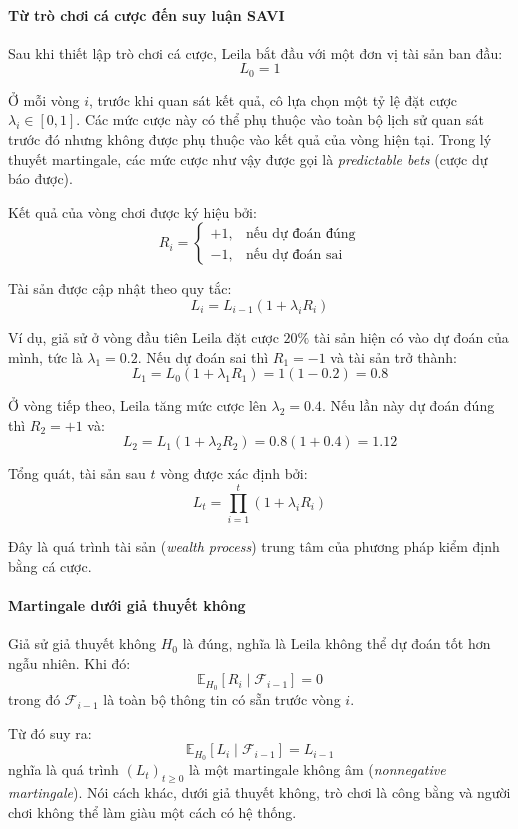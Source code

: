 \paragraph{Từ trò chơi cá cược đến suy luận SAVI}

Sau khi thiết lập trò chơi cá cược, Leila bắt đầu với một đơn vị tài sản ban đầu:
\[
    L_0 = 1
\]

Ở mỗi vòng $i$, trước khi quan sát kết quả, cô lựa chọn một tỷ lệ đặt cược $\lambda_i \in [0,1]$. Các mức cược này có thể phụ thuộc vào toàn bộ lịch sử quan sát trước đó nhưng không được phụ thuộc vào kết quả của vòng hiện tại. Trong lý thuyết martingale, các mức cược như vậy được gọi là \textit{predictable bets} (cược dự báo được).

Kết quả của vòng chơi được ký hiệu bởi:
\[
    R_i = 
    \begin{cases}
        +1, & \text{nếu dự đoán đúng} \\
        -1, & \text{nếu dự đoán sai}
    \end{cases}
\]

Tài sản được cập nhật theo quy tắc:
\[
    L_i = L_{i-1}(1+\lambda_i R_i)
\]

Ví dụ, giả sử ở vòng đầu tiên Leila đặt cược $20\%$ tài sản hiện có vào dự đoán của mình, tức là $\lambda_1=0.2$. Nếu dự đoán sai thì $R_1=-1$ và tài sản trở thành:
\[
    L_1 = L_0(1+\lambda_1 R_1) = 1(1-0.2) = 0.8
\]

Ở vòng tiếp theo, Leila tăng mức cược lên $\lambda_2=0.4$. Nếu lần này dự đoán đúng thì $R_2=+1$ và:
\[
    L_2 = L_1(1+\lambda_2 R_2) = 0.8(1+0.4) = 1.12
\]

Tổng quát, tài sản sau $t$ vòng được xác định bởi:
\[
    L_t = \prod_{i=1}^{t} (1+\lambda_i R_i)
\]

Đây là quá trình tài sản (\textit{wealth process}) trung tâm của phương pháp kiểm định bằng cá cược.

\paragraph{Martingale dưới giả thuyết không}

Giả sử giả thuyết không $H_0$ là đúng, nghĩa là Leila không thể dự đoán tốt hơn ngẫu nhiên. Khi đó:
\[
    \mathbb{E}_{H_0}[R_i \mid \mathcal{F}_{i-1}] = 0
\]
trong đó $\mathcal{F}_{i-1}$ là toàn bộ thông tin có sẵn trước vòng $i$.

Từ đó suy ra:
\[
    \mathbb{E}_{H_0} [ L_i \mid \mathcal{F}_{i-1} ] = L_{i-1}
\]
nghĩa là quá trình $(L_t)_{t\ge0}$ là một martingale không âm (\textit{nonnegative martingale}). Nói cách khác, dưới giả thuyết không, trò chơi là công bằng và người chơi không thể làm giàu một cách có hệ thống.

